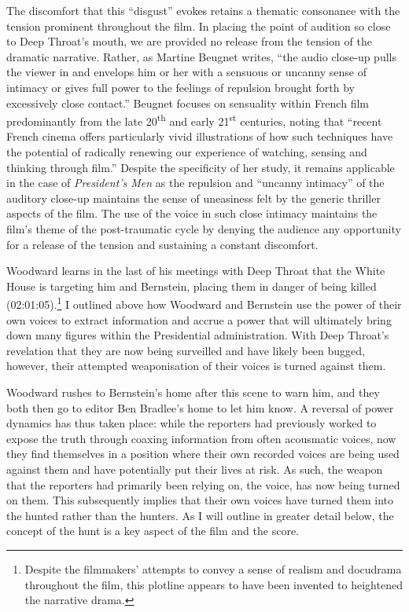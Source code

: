 The discomfort that this ``disgust” evokes retains a thematic consonance with the tension prominent throughout the film.
In placing the point of audition so close to Deep Throat’s mouth, we are provided no release from the tension of the dramatic narrative.
Rather, as Martine Beugnet writes, ``the audio close-up pulls the viewer in and envelops him or her with a sensuous or uncanny sense of intimacy or gives full power to the feelings of repulsion brought forth by excessively close contact.”\autocites[][91]{beugnet_cinema_2022}
Beugnet focuses on sensuality within French film predominantly from the late 20\textsuperscript{th} and early 21\textsuperscript{st} centuries, noting that ``recent French cinema offers particularly vivid illustrations of how such techniques have the potential of radically renewing our experience of watching, sensing and thinking through film.”\autocites[][63]{beugnet_cinema_2022}
Despite the specificity of her study, it remains applicable in the case of \textit{President’s Men} as the repulsion and ``uncanny intimacy” of the auditory close-up maintains the sense of uneasiness felt by the generic thriller aspects of the film.
The use of the voice in such close intimacy maintains the film’s theme of the post-traumatic cycle by denying the audience any opportunity for a release of the tension and sustaining a constant discomfort.

Woodward learns in the last of his meetings with Deep Throat that the White House is targeting him and Bernstein, placing them in danger of being killed (02:01:05).\footnote{Despite the filmmakers' attempts to convey a sense of realism and docudrama throughout the film, this plotline appears to have been invented to heightened the narrative drama.}
I outlined above how Woodward and Bernstein use the power of their own voices to extract information and accrue a power that will ultimately bring down many figures within the Presidential administration.
With Deep Throat's revelation that they are now being surveilled and have likely been bugged, however, their attempted weaponisation of their voices is turned against them.

Woodward rushes to Bernstein’s home after this scene to warn him, and they both then go to editor Ben Bradlee’s home to let him know.
A reversal of power dynamics has thus taken place: while the reporters had previously worked to expose the truth through coaxing information from often acousmatic voices, now they find themselves in a position where their own recorded voices are being used against them and have potentially put their lives at risk.
As such, the weapon that the reporters had primarily been relying on, the voice, has now being turned on them.
This subsequently implies that their own voices have turned them into the hunted rather than the hunters.
As I will outline in greater detail below, the concept of the hunt is a key aspect of the film and the score.

